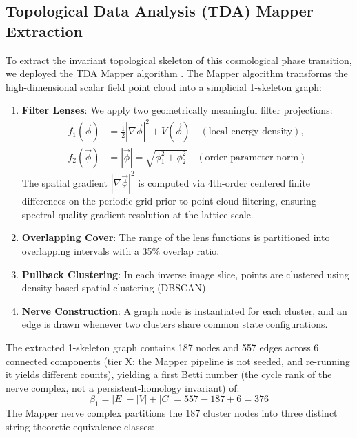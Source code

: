 \documentclass[11pt,a4paper]{article}
\newcommand{\numreconcile}[2]{#1}
\begin{document}
\subsection{Topological Data Analysis (TDA) Mapper Extraction}
To extract the invariant topological skeleton of this cosmological phase transition, we deployed the TDA Mapper algorithm \cite{singh2007}. The Mapper algorithm transforms the high-dimensional scalar field point cloud into a simplicial 1-skeleton graph:
\begin{enumerate}
    \item \textbf{Filter Lenses}: We apply two geometrically meaningful filter projections:
    \begin{align}
    f_1(\vec{\phi}) &= \frac{1}{2}|\nabla \vec{\phi}|^2 + V(\vec{\phi}) \quad (\text{local energy density}), \\
    f_2(\vec{\phi}) &= |\vec{\phi}| = \sqrt{\phi_1^2 + \phi_2^2} \quad (\text{order parameter norm})
    \end{align}
    The spatial gradient $|\nabla \vec{\phi}|^2$ is computed via 4th-order centered finite differences on the periodic grid prior to point cloud filtering, ensuring spectral-quality gradient resolution at the lattice scale.
    \item \textbf{Overlapping Cover}: The range of the lens functions is partitioned into overlapping intervals with a 35\% overlap ratio.
    \item \textbf{Pullback Clustering}: In each inverse image slice, points are clustered using density-based spatial clustering (DBSCAN).
    \item \textbf{Nerve Construction}: A graph node is instantiated for each cluster, and an edge is drawn whenever two clusters share common state configurations.
\end{enumerate}
The extracted 1-skeleton graph contains \numreconcile{187}{Mapper nodes} nodes and \numreconcile{557}{Mapper edges} edges across \numreconcile{6}{connected components} connected components (tier X: the Mapper pipeline is not seeded, and re-running it yields different counts), yielding a first Betti number (the cycle rank of the nerve complex, not a persistent-homology invariant) of:
\begin{equation}
\beta_1 = |E| - |V| + |C| = \numreconcile{557}{Mapper edges} - \numreconcile{187}{Mapper nodes} + \numreconcile{6}{connected components} = \numreconcile{376}{cycle rank}
\end{equation}
The Mapper nerve complex partitions the \numreconcile{187}{Mapper nodes} cluster nodes into three distinct string-theoretic equivalence classes:
\end{document}
